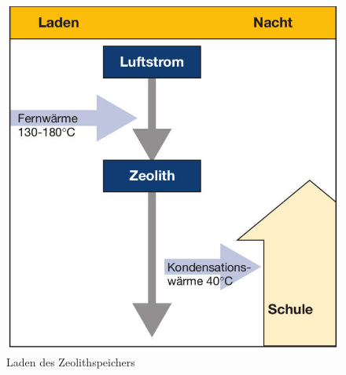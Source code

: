 \documentclass[11pt,a4paper]{scrartcl}
\begin{document}
\begin{figure}[h!]
\begin{center}
\includegraphics[scale=1]{images/Laden.jpg}
\caption{Laden des Zeolithspeichers \cite{BINE2}}
\label{fig:Laden}
\end{center}
\end{figure}
\end{document}
